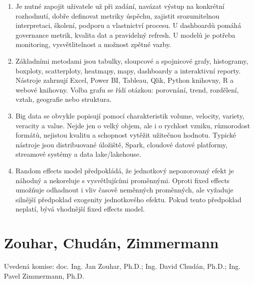 \documentclass[12pt,a4paper]{article}
\begin{document}
\begin{enumerate}
  \item {}

  Je nutné zapojit uživatele už při zadání, navázat výstup na konkrétní rozhodnutí, dobře definovat
  metriky úspěchu, zajistit srozumitelnou interpretaci, školení, podporu a vlastnictví procesu.
  U dashboardů pomáhá governance metrik, kvalita dat a pravidelný refresh. U modelů je potřeba
  monitoring, vysvětlitelnost a možnost zpětné vazby.

  \item {}

  Základními metodami jsou tabulky, sloupcové a spojnicové grafy, histogramy, boxploty, scatterploty,
  heatmapy, mapy, dashboardy a interaktivní reporty. Nástroje zahrnují Excel, Power BI, Tableau, Qlik,
  Python knihovny, R a webové knihovny. Volba grafu se řídí otázkou: porovnání, trend, rozdělení,
  vztah, geografie nebo struktura.

  \item {}

  Big data se obvykle popisují pomocí charakteristik volume, velocity, variety, veracity a value.
  Nejde jen o velký objem, ale i o rychlost vzniku, různorodost formátů, nejistou kvalitu a schopnost
  vytěžit užitečnou hodnotu. Typické nástroje jsou distribuované úložiště, Spark, cloudové datové
  platformy, streamové systémy a data lake/lakehouse.

  \item {}

  Random effects model předpokládá, že jednotkový nepozorovaný efekt je náhodný a nekoreluje s
  vysvětlujícími proměnnými. Oproti fixed effects umožňuje odhadnout i vliv časově neměnných proměnných,
  ale vyžaduje silnější předpoklad exogenity jednotkového efektu. Pokud tento předpoklad neplatí,
  bývá vhodnější fixed effects model.
\end{enumerate}

\section{Zouhar, Chudán, Zimmermann}
Uvedená komise: doc. Ing. Jan Zouhar, Ph.D.; Ing. David Chudán, Ph.D.; Ing. Pavel Zimmermann, Ph.D.
\end{document}
